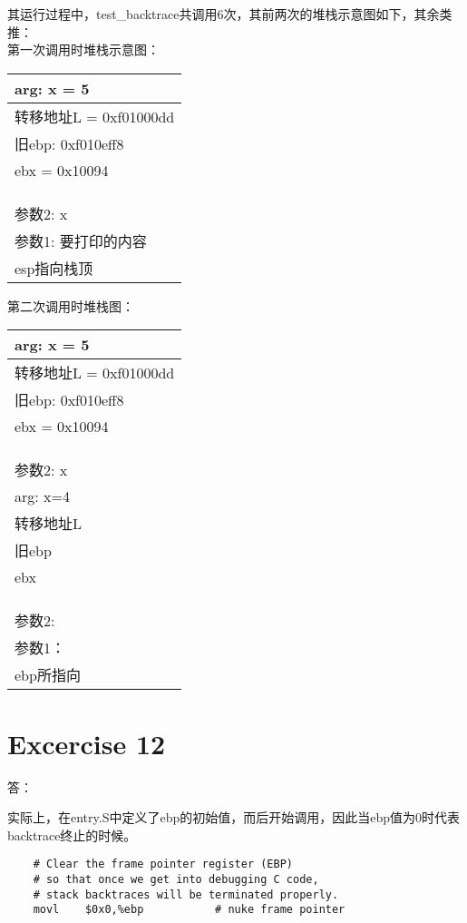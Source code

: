 \documentclass{article}
\begin{document}
{其运行过程中，test\_backtrace共调用6次，其前两次的堆栈示意图如下，其余类推：\\
第一次调用时堆栈示意图：\\
\begin{tabular}{|l|}
\hline
arg: x = 5\\
\hline
转移地址L = 0xf01000dd\\
\hline
旧ebp: 0xf010eff8\\
\hline
ebx = 0x10094\\
\hline
 \\
\hline
 \\
\hline
 \\
\hline
参数2: x\\
\hline
参数1: 要打印的内容\\
\hline
esp指向栈顶\\
\hline
\end{tabular}

第二次调用时堆栈图：\\
\begin{tabular}{|l|}
\hline
arg: x = 5\\
\hline
转移地址L = 0xf01000dd\\
\hline
旧ebp: 0xf010eff8\\
\hline
ebx = 0x10094\\
\hline
 \\
\hline
 \\
\hline
 \\
\hline
参数2: x\\
\hline
arg: x=4\\
\hline
转移地址L\\
\hline
旧ebp\\
\hline
ebx\\
\hline
 \\
\hline
 \\
\hline
 \\
\hline
参数2: \\
\hline
参数1：\\
\hline
ebp所指向\\
\hline
\end{tabular}

\section{Excercise 12}
\begin{Large}答：\end{Large}
实际上，在entry.S中定义了ebp的初始值，而后开始调用，因此当ebp值为0时代表backtrace终止的时候。
\begin{verbatim}
	# Clear the frame pointer register (EBP)
	# so that once we get into debugging C code,
	# stack backtraces will be terminated properly.
	movl	$0x0,%ebp			# nuke frame pointer


\end{verbatim}}
\end{document}
